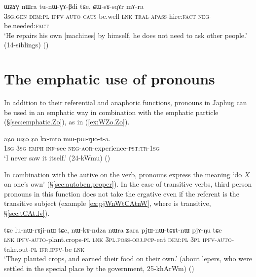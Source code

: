 \begin{exe}
\ex \label{ex:WZAG.nWra}
\gll ɯʑɤɣ nɯra tu-nɯ-ɣɤ-βdi tɕe, ɕɯ-sɤ-sqɤr mɤ-ra \\
\textsc{3sg}:\textsc{gen} \textsc{dem}:\textsc{pl} \textsc{ipfv}-\textsc{auto}-\textsc{caus}-be.well \textsc{lnk} \textsc{tral}-\textsc{apass}-hire:\textsc{fact} \textsc{neg}-be.needed:\textsc{fact} \\
\glt `He repairs his own [machines] by himself, he does not need to ask other people.' (14-siblings) ()
\end{exe} 

\section{The emphatic use of pronouns} \label{sec:pronouns.emph}
In addition to their referential and anaphoric functions, pronouns in Japhug can be used in an emphatic way in combination with the emphatic particle  (§\ref{sec:emphatic.Zo}), as in  (\ref{ex:WZo.Zo}).

\begin{exe}
\ex \label{ex:WZo.Zo}
\gll aʑo ɯʑo ʑo kɤ-mto mɯ-pɯ-rɲo-t-a. \\
\textsc{1sg} \textsc{3sg} \textsc{emph} \textsc{inf}-see \textsc{neg}-\textsc{aor}-experience-\textsc{pst}:\textsc{tr}-\textsc{1sg} \\
\glt `I never saw it itself.' (24-kWmu)
()
\end{exe} 

In combination with the autive  on the verb, pronouns express the meaning `do $X$ on one's own' (§\ref{sec:autoben.proper}). In the case of transitive verbs, third person pronouns in this function does not take the ergative even if the referent is the transitive subject (example \ref{ex:pjWnWtCAtnW}, where  is transitive, §\ref{sec:tCAt.lv}).
 
\begin{exe}
\ex \label{ex:pjWnWtCAtnW}
\gll tɕe lu-nɯ-rɤji-nɯ tɕe, nɯ-kɤ-ndza nɯra ʑara pjɯ-nɯ-tɕɤt-nɯ pjɤ-ŋu tɕe \\
\textsc{lnk} \textsc{ipfv}-\textsc{auto}-plant.crops-\textsc{pl} \textsc{lnk} \textsc{3pl}.\textsc{poss}-\textsc{obj}.\textsc{pcp}-eat \textsc{dem}:\textsc{pl} \textsc{3pl} \textsc{ipfv}-\textsc{auto}-take.out-\textsc{pl} \textsc{ifr}.\textsc{ipfv}-be \textsc{lnk} \\
\glt `They planted crops, and earned their food on their own.' (about lepers, who were settled in the special place by the government, 25-khArWm)
()
\end{exe} 

